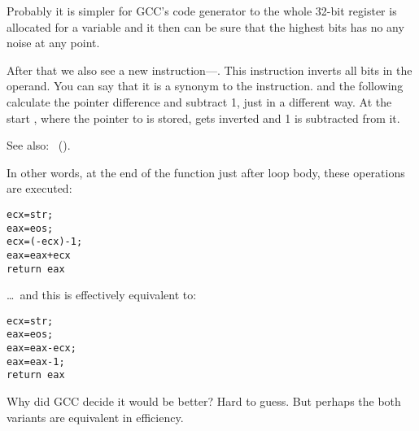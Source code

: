Probably it is simpler for GCC's code generator to  
the whole 32-bit \EDX register 
is allocated for a \Tchar variable and it then can be sure that the highest bits has no any noise 
at any point.

\label{strlen_NOT_ADD}

After that we also see a new instruction---\NOT. This instruction inverts all bits in the operand. 
You can say that it is a synonym to the  instruction. 
\NOT and the following \ADD calculate the pointer difference and subtract 1, just in a different way. 
At the start \ECX, where the pointer to  is stored, gets inverted and 1 is subtracted from it.

See also: \q{\SignedNumbersSectionName}~().
 
In other words, at the end of the function just after loop body, these operations are executed:

\begin{lstlisting}
ecx=str;
eax=eos;
ecx=(-ecx)-1; 
eax=eax+ecx
return eax
\end{lstlisting}

\dots~and this is effectively equivalent to:

\begin{lstlisting}
ecx=str;
eax=eos;
eax=eax-ecx;
eax=eax-1;
return eax
\end{lstlisting}

Why did GCC decide it would be better? Hard to guess. 
But perhaps the both variants are equivalent in efficiency.

